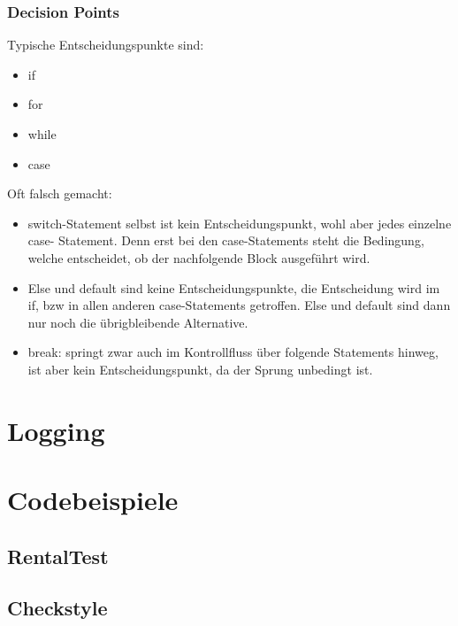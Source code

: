 \documentclass[10pt]{article}
\begin{document}
	\subsubsection{Decision Points}
	Typische Entscheidungspunkte sind:
	\begin{multicols}{2}
	\begin{itemize}
		\item if
		\item for
		\item while
		\item case
	\end{itemize}
	\end{multicols}
	Oft falsch gemacht:
	\begin{itemize}
		\item switch-Statement selbst ist kein Entscheidungspunkt, wohl aber jedes einzelne case- Statement. Denn erst bei den case-Statements steht die Bedingung, welche entscheidet, ob der nachfolgende Block ausgeführt wird.
		\item Else und default sind keine Entscheidungspunkte, die Entscheidung wird im if, bzw in allen anderen case-Statements getroffen. Else und default sind dann nur noch die übrigbleibende Alternative.
		\item break: springt zwar auch im Kontrollfluss über folgende Statements hinweg, ist aber kein Entscheidungspunkt, da der Sprung unbedingt ist.
	\end{itemize}
	
	\newpage
	
	
	\section{Logging}
	
    \section{Codebeispiele} \label{sec:codebeispiele}

    \subsection{RentalTest} \label{subsec:rentaltest}
    
	\newpage
	

    \subsection{Checkstyle} \label{subsec:heckstyle}
    

\end{document}
